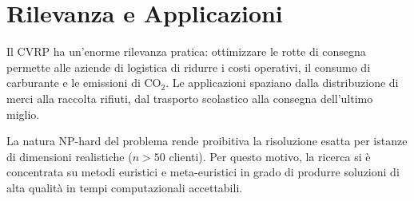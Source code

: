\section{Rilevanza e Applicazioni}

Il CVRP ha un'enorme rilevanza pratica: ottimizzare le rotte di consegna permette
alle aziende di logistica di ridurre i costi operativi, il consumo di carburante
e le emissioni di CO$_2$. Le applicazioni spaziano dalla distribuzione di merci
alla raccolta rifiuti, dal trasporto scolastico alla consegna dell'ultimo miglio.

La natura NP-hard del problema rende proibitiva la risoluzione esatta per istanze
di dimensioni realistiche ($n > 50$ clienti). Per questo motivo, la ricerca si \`e
concentrata su metodi euristici e meta-euristici \cite{goldberg1989genetic, prins2004simple, vidal2012unified}
in grado di produrre soluzioni
di alta qualit\`a in tempi computazionali accettabili.
